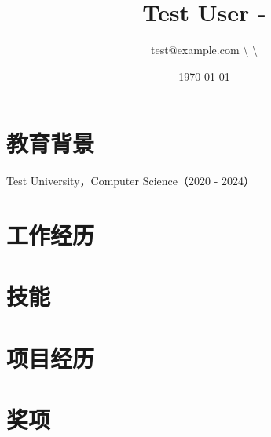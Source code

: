 \documentclass{article}%
\title{Test User {-} }%
\author{test@example.com \textbackslash{}  \textbackslash{} }%
\date{\today}%
\begin{document}
%
\normalsize%
\maketitle%
%
\newline%
\newline%
\section{教育背景}%
\label{sec:}%
Test University，Computer Science（2020 {-} 2024）%
\newline

%
\section{工作经历}%
\label{sec:}%

%
\section{技能}%
\label{sec:}%

%
\section{项目经历}%
\label{sec:}%

%
\section{奖项}%
\label{sec:}%

%
\end{document}
